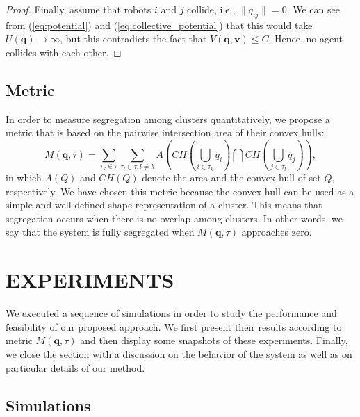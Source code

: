 \documentclass[letterpaper, 10 pt, conference]{ieeeconf}  %
\newcommand{\norm}[1]{\lVert#1\rVert}
\begin{document}
\begin{proof}
  Finally, assume that robots $i$ and $j$ collide, i.e.,
  $\norm{q_{ij}} = 0$. We can see from (\ref{eq:potential}) and
  (\ref{eq:collective_potential}) that this would take $U(\mathbf{q})
  \to \infty$, but this contradicts the fact that $V(\mathbf{q}, \mathbf{v})
  \leq C$. Hence, no agent collides with each other.
\end{proof}
\subsection{Metric}
In order to measure segregation among clusters quantitatively, we
propose a metric that is based on the pairwise intersection area of
their convex hulls:
\begin{equation}
  \label{eq:metric}
  M(\mathbf{q}, \tau) = \sum_{\tau_k \in \tau} \sum_{\tau_l \in \tau, l \neq k} A\left(CH(\bigcup_{i \in \tau_k}q_i) \bigcap CH(\bigcup_{j \in \tau_l} q_j) \right),
\end{equation}
in which $A(Q)$ and $CH(Q)$ denote the area and the convex hull of set
$Q$, respectively. We have chosen this metric because the convex hull
can be used as a simple and well-defined shape representation of a
cluster. This means that segregation occurs when there is no overlap
among clusters. In other words, we say that the system is fully
segregated when $M(\mathbf{q}, \tau)$ approaches zero.

\section{EXPERIMENTS}
\label{sec:experiments}

We executed a sequence of simulations in order to study the
performance and feasibility of our proposed approach. We first present
their results according to metric $M(\mathbf{q}, \tau)$ and then
display some snapshots of these experiments. Finally, we close the
section with a discussion on the behavior of the system as well as on
particular details of our method.

\subsection{Simulations}
\end{document}
